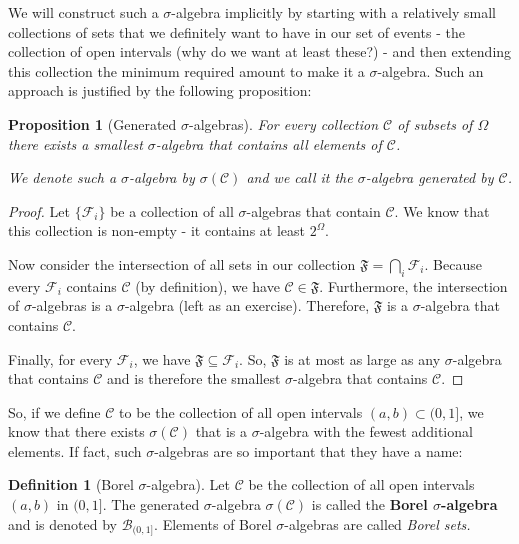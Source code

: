 \documentclass{book}
\theoremstyle{plain}%
\newtheorem{proposition}{Proposition}[section]
\theoremstyle{definition}
\newtheorem{definition}{Definition}[section]
\begin{document}
We will construct such a $\sigma$-algebra implicitly by starting with a relatively small collections of sets that we definitely want to have in our set of events - the collection of open intervals (why do we want at least these?) - and then extending this collection the minimum required amount to make it a $\sigma$-algebra. Such an approach is justified by the following proposition:

\begin{proposition}[Generated $\sigma$-algebras]
For every collection $\mathcal{C}$ of subsets of $\Omega$ there exists a smallest $\sigma$-algebra that contains all elements of $\mathcal{C}$.

We denote such a $\sigma$-algebra by $\sigma(\mathcal{C})$ and we call it the $\sigma$-algebra generated by $\mathcal{C}$.\label{prop:generated_algebras}
\end{proposition}

\begin{proof}
Let $\{\mathcal{F}_i\}$ be a collection of all $\sigma$-algebras that contain $\mathcal{C}$. We know that this collection is non-empty - it contains at least $2^{{\Omega}}$.

Now consider the intersection of all sets in our collection $\mathfrak{F} = \bigcap_{i} \mathcal{F}_i$. Because every $\mathcal{F}_i$ contains $\mathcal{C}$ (by definition), we have $\mathcal{C} \in \mathfrak{F}$. Furthermore, the intersection of $\sigma$-algebras is a $\sigma$-algebra (left as an exercise). Therefore, $\mathfrak{F}$ is a $\sigma$-algebra that contains $\mathcal{C}$.

Finally, for every $\mathcal{F}_i$, we have $\mathfrak{F} \subseteq \mathcal{F}_i$. So, $\mathfrak{F}$ is at most as large as any $\sigma$-algebra that contains $\mathcal{C}$ and is therefore the smallest $\sigma$-algebra that contains $\mathcal{C}$.
\end{proof}

So, if we define $\mathcal{C}$ to be the collection of all open intervals $(a,b) \subset (0,1]$, we know that there exists $\sigma(\mathcal{C})$ that is a $\sigma$-algebra with the fewest additional elements. If fact, such $\sigma$-algebras are so important that they have a name:

\begin{definition}[Borel $\sigma$-algebra] Let $\mathcal{C}$ be the collection of all open intervals $(a, b)$ in $(0,1]$. The generated $\sigma$-algebra $\sigma(\mathcal{C})$ is called the \textbf{Borel $\sigma$-algebra} and is denoted by $\mathcal{B}_{(0,1]}$. Elements of Borel $\sigma$-algebras are called \emph{Borel sets.}
\end{definition}
\end{document}
